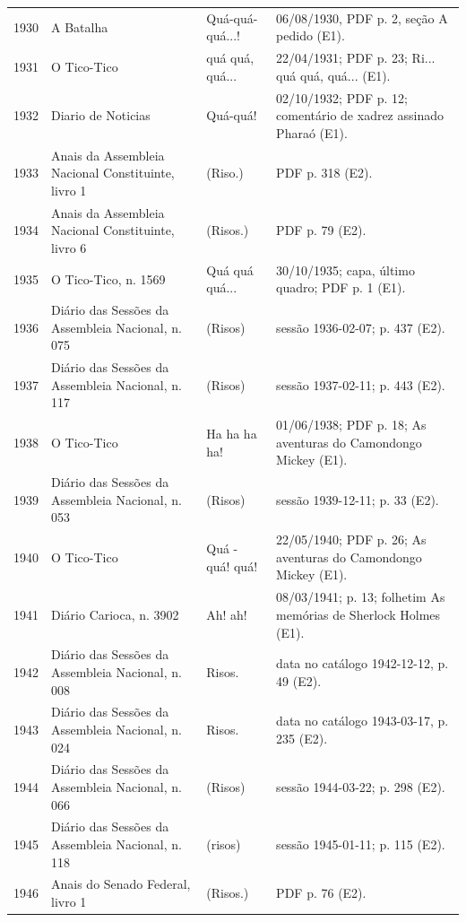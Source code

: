 \begin{longtable}{p{}p{}p{}p{}}
1930 & A Batalha \cite{anual1930} & Quá-quá-quá...! & 06/08/1930, PDF p. 2, seção A pedido (E1). \\
1931 & O Tico-Tico \cite{anual1931} & quá quá, quá... & 22/04/1931; PDF p. 23; Ri... quá quá, quá... (E1). \\
1932 & Diario de Noticias \cite{anual1932} & Quá-quá! & 02/10/1932; PDF p. 12; comentário de xadrez assinado Pharaó (E1). \\
1933 & Anais da Assembleia Nacional Constituinte, livro 1 \cite{anual1933} & (Riso.) & PDF p. 318 (E2). \\
1934 & Anais da Assembleia Nacional Constituinte, livro 6 \cite{anual1934} & (Risos.) & PDF p. 79 (E2). \\
1935 & O Tico-Tico, n. 1569 \cite{ticotico1935} & Quá quá quá... & 30/10/1935; capa, último quadro; PDF p. 1 (E1). \\
1936 & Diário das Sessões da Assembleia Nacional, n. 075 \cite{anual1936} & (Risos) & sessão 1936-02-07; p. 437 (E2). \\
1937 & Diário das Sessões da Assembleia Nacional, n. 117 \cite{anual1937} & (Risos) & sessão 1937-02-11; p. 443 (E2). \\
1938 & O Tico-Tico \cite{anual1938} & Ha ha ha ha! & 01/06/1938; PDF p. 18; As aventuras do Camondongo Mickey (E1). \\
1939 & Diário das Sessões da Assembleia Nacional, n. 053 \cite{anual1939} & (Risos) & sessão 1939-12-11; p. 33 (E2). \\
1940 & O Tico-Tico \cite{anual1940} & Quá - quá! quá! & 22/05/1940; PDF p. 26; As aventuras do Camondongo Mickey (E1). \\
1941 & Diário Carioca, n. 3902 \cite{carioca1941} & Ah! ah! & 08/03/1941; p. 13; folhetim As memórias de Sherlock Holmes (E1). \\
1942 & Diário das Sessões da Assembleia Nacional, n. 008 \cite{anual1942} & Risos. & data no catálogo 1942-12-12, p. 49 (E2). \\
1943 & Diário das Sessões da Assembleia Nacional, n. 024 \cite{anual1943} & Risos. & data no catálogo 1943-03-17, p. 235 (E2). \\
1944 & Diário das Sessões da Assembleia Nacional, n. 066 \cite{anual1944} & (Risos) & sessão 1944-03-22; p. 298 (E2). \\
1945 & Diário das Sessões da Assembleia Nacional, n. 118 \cite{anual1945} & (risos) & sessão 1945-01-11; p. 115 (E2). \\
1946 & Anais do Senado Federal, livro 1 \cite{anual1946} & (Risos.) & PDF p. 76 (E2). \\

\end{longtable}

